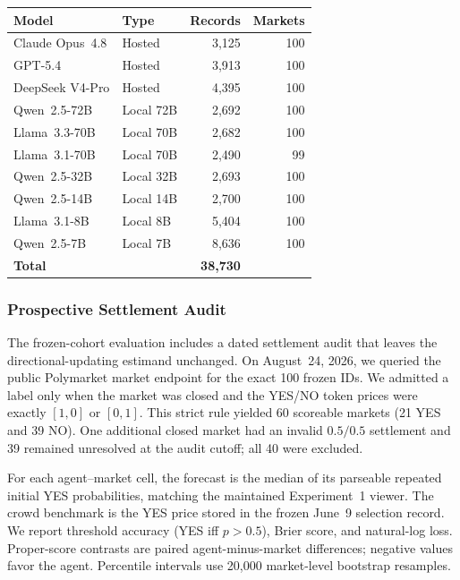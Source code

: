 \begin{center}
\begin{minipage}{\linewidth}
\centering
{}
\label{tab:model-summary}
\small
\begin{tabular}{llrr}
\toprule
\textbf{Model} & \textbf{Type} & \textbf{Records} & \textbf{Markets} \\
\midrule
Claude Opus~4.8 & Hosted  & 3{,}125 & 100 \\
GPT-5.4         & Hosted  & 3{,}913 & 100 \\
DeepSeek V4-Pro & Hosted  & 4{,}395 & 100 \\
Qwen~2.5-72B    & Local 72B & 2{,}692 & 100 \\
Llama~3.3-70B   & Local 70B & 2{,}682 & 100 \\
Llama~3.1-70B   & Local 70B & 2{,}490 &  99 \\
Qwen~2.5-32B    & Local 32B & 2{,}693 & 100 \\
Qwen~2.5-14B    & Local 14B & 2{,}700 & 100 \\
Llama~3.1-8B    & Local 8B  & 5{,}404 & 100 \\
Qwen~2.5-7B     & Local 7B  & 8{,}636 & 100 \\
\midrule
\textbf{Total}  &           & \textbf{38{,}730} & \\
\bottomrule
\end{tabular}
\end{minipage}
\end{center}

\subsubsection{Prospective Settlement Audit}
\label{app:exp1-outcome-followup}

The frozen-cohort evaluation includes a dated settlement audit that leaves the
directional-updating estimand unchanged. On August~24, 2026, we queried the public
Polymarket market endpoint for the exact 100 frozen IDs. We admitted a label only
when the market was closed and the YES/NO token prices were exactly
\([1,0]\) or \([0,1]\).  This strict rule yielded 60 scoreable markets
(21 YES and 39 NO). One additional closed market had an invalid \(0.5/0.5\)
settlement and 39 remained unresolved at the audit cutoff; all 40 were excluded.

For each agent--market cell, the forecast is the median of its parseable repeated
initial YES probabilities, matching the maintained Experiment~1 viewer.  The crowd
benchmark is the YES price stored in the frozen June~9 selection record.  We report
threshold accuracy (YES iff \(p>0.5\)), Brier score, and natural-log loss.  Proper-score
contrasts are paired agent-minus-market differences; negative values favor the
agent.  Percentile intervals use 20,000 market-level bootstrap resamples.

